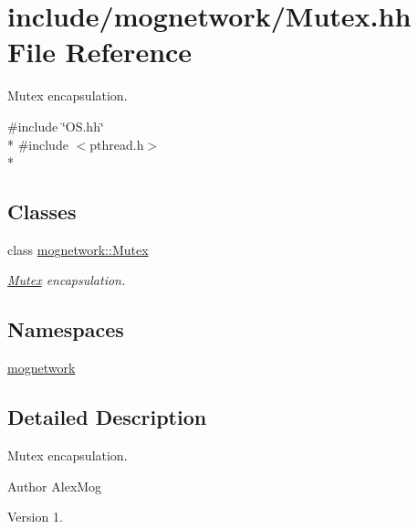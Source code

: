 \hypertarget{_mutex_8hh}{\section{include/mognetwork/\-Mutex.hh File Reference}
\label{_mutex_8hh}
}


Mutex encapsulation.  


{\ttfamily \#include \char`\"{}O\-S.\-hh\char`\"{}}\\*
{\ttfamily \#include $<$pthread.\-h$>$}\\*
\subsection*{Classes}
\begin{DoxyCompactItemize}
\item 
class \hyperlink{classmognetwork_1_1_mutex}{mognetwork\-::\-Mutex}
\begin{DoxyCompactList}\small\item\em \hyperlink{classmognetwork_1_1_mutex}{Mutex} encapsulation. \end{DoxyCompactList}\end{DoxyCompactItemize}
\subsection*{Namespaces}
\begin{DoxyCompactItemize}
\item 
\hyperlink{namespacemognetwork}{mognetwork}
\end{DoxyCompactItemize}


\subsection{Detailed Description}
Mutex encapsulation. \begin{DoxyAuthor}{Author}
Alex\-Mog 
\end{DoxyAuthor}
\begin{DoxyVersion}{Version}
1. 
\end{DoxyVersion}

